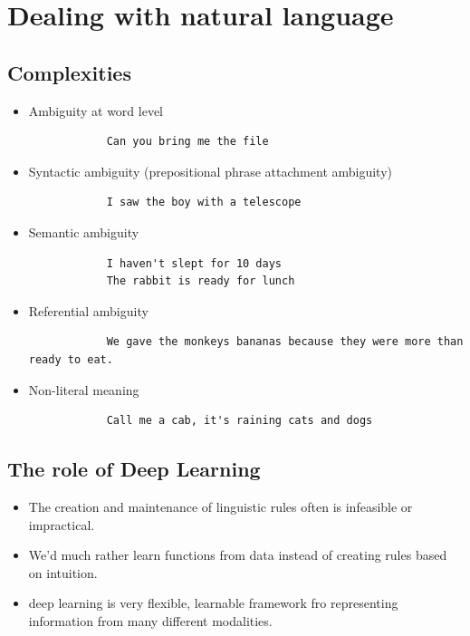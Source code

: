 \documentclass[11pt]{article}
\begin{document}


\tableofcontents

\clearpage

\section{Dealing with natural language}

\subsection{Complexities}

\begin{itemize}
    \item Ambiguity at word level
          \begin{lstlisting}
            Can you bring me the file
        \end{lstlisting}
    \item Syntactic ambiguity (prepositional phrase attachment ambiguity)
          \begin{lstlisting}
            I saw the boy with a telescope
        \end{lstlisting}
    \item Semantic ambiguity
          \begin{lstlisting}
            I haven't slept for 10 days
            The rabbit is ready for lunch
        \end{lstlisting}
    \item Referential ambiguity
          \begin{lstlisting}
            We gave the monkeys bananas because they were more than ready to eat.
        \end{lstlisting}
    \item Non-literal meaning
          \begin{lstlisting}
            Call me a cab, it's raining cats and dogs
        \end{lstlisting}
\end{itemize}

\subsection{The role of Deep Learning}

\begin{itemize}
    \item The creation and maintenance of linguistic rules often is infeasible or impractical.
    \item We'd much rather learn functions from data instead of creating rules based on intuition.
    \item deep learning is very flexible, learnable framework fro representing information from many different modalities.
\end{itemize}
\end{document}
